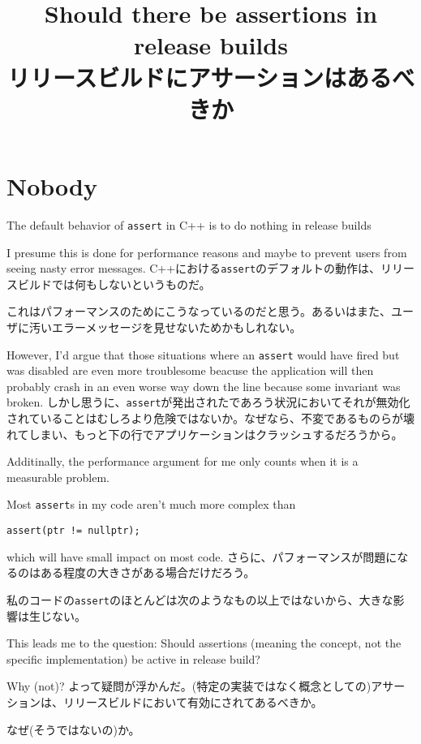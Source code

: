 \documentclass[uplatex,dvipdfmx]{jsarticle} \usepackage{amsmath,amssymb,bm}
\title{Should there be assertions in release builds\\リリースビルドにアサーションはあるべきか} \author{} \date{}
\begin{document}
\maketitle


\section*{Nobody}
\begin{paracol}{2}
The default behavior of {\tt assert} in C++ is to do nothing in release builds

I presume this is done for performance reasons and maybe to prevent users from seeing nasty error messages.
\switchcolumn
C++における{\tt assert}のデフォルトの動作は、リリースビルドでは何もしないというものだ。

これはパフォーマンスのためにこうなっているのだと思う。あるいはまた、ユーザに汚いエラーメッセージを見せないためかもしれない。
\end{paracol}
\vspace{\baselineskip}
\begin{paracol}{2}
However, I'd argue that those situations where an {\tt assert} would have fired but was disabled are even more troublesome beacuse the application will then probably crash in an even worse way down the line because some invariant was broken.
\switchcolumn
しかし思うに、{\tt assert}が発出されたであろう状況においてそれが無効化されていることはむしろより危険ではないか。なぜなら、不変であるものらが壊れてしまい、もっと下の行でアプリケーションはクラッシュするだろうから。
\end{paracol}
\vspace{\baselineskip}
\begin{paracol}{2}
Additinally, the performance argument for me only counts when it is a measurable problem.

Most {\tt assert}s in my code aren't much more complex than

\begin{verbatim}
assert(ptr != nullptr);
\end{verbatim}

which will have small impact on most code.
\switchcolumn
さらに、パフォーマンスが問題になるのはある程度の大きさがある場合だけだろう。

私のコードの{\tt assert}のほとんどは次のようなもの以上ではないから、大きな影響は生じない。
\end{paracol}
\vspace{\baselineskip}
\begin{paracol}{2}
This leads me to the question: Should assertions (meaning the concept, not the specific implementation) be active in release build?

Why (not)?
\switchcolumn
よって疑問が浮かんだ。(特定の実装ではなく概念としての)アサーションは、リリースビルドにおいて有効にされてあるべきか。

なぜ(そうではないの)か。
\end{paracol}
\end{document}
